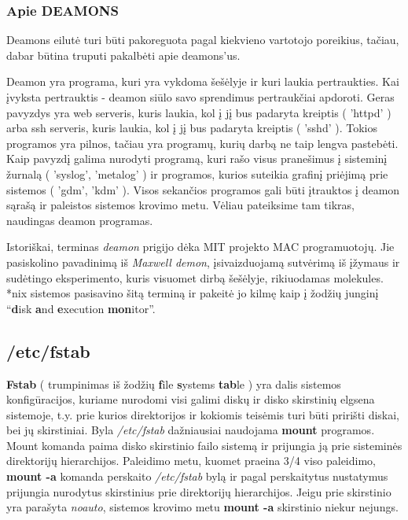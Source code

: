 \subsubsection{Apie DEAMONS}

Deamons eilutė turi būti pakoreguota pagal kiekvieno vartotojo
poreikius, tačiau, dabar būtina truputi pakalbėti apie deamons'us. 

Deamon yra programa, kuri yra vykdoma šešėlyje ir kuri laukia
pertraukties. Kai įvyksta pertrauktis - deamon siūlo savo sprendimus
pertraukčiai apdoroti. Geras pavyzdys yra web serveris, kuris laukia,
kol į jį bus padaryta kreiptis ( 'httpd' ) arba ssh serveris, kuris
laukia, kol į jį bus padaryta kreiptis ( 'sshd' ). Tokios programos
yra pilnos, tačiau yra programų, kurių darbą ne taip lengva
pastebėti. Kaip pavyzdį galima nurodyti programą, kuri rašo visus
pranešimus į sisteminį žurnalą ( 'syslog', 'metalog' ) ir programos,
kurios suteikia grafinį priėjimą prie sistemos ( 'gdm', 'kdm' ). Visos
sekančios programos gali būti įtrauktos į deamon sąrašą ir paleistos
sistemos krovimo metu. Vėliau pateiksime tam tikras, naudingas deamon
programas. 

Istoriškai, terminas \textsl{deamon} prigijo dėka MIT projekto MAC
programuotojų. Jie pasiskolino pavadinimą iš \textsl{Maxwell demon},
įsivaizduojamą sutvėrimą iš įžymaus ir sudėtingo eksperimento, kuris
visuomet dirbą šešėlyje, rikiuodamas molekules. *nix sistemos
pasisavino šitą terminą ir pakeitė jo kilmę kaip į žodžių junginį
``\textbf{d}isk \textbf{a}nd \textbf{e}xecution \textbf{mon}itor''.


\subsection{/etc/fstab}

\textbf{Fstab} ( trumpinimas iš žodžių \textbf{f}ile \textbf{s}ystems
\textbf{tab}le ) yra dalis sistemos konfigūracijos, kuriame nurodomi
visi galimi diskų ir disko skirstinių elgsena sistemoje, t.y. prie
kurios direktorijos ir kokiomis teisėmis turi būti pririšti diskai,
bei jų skirstiniai. Byla \textsl{/etc/fstab} dažniausiai naudojama
\textbf{mount} programos. Mount komanda paima disko skirstinio failo
sistemą ir prijungia ją prie sisteminės direktorijų
hierarchijos. Paleidimo metu, kuomet praeina 3/4 viso paleidimo,
\textbf{mount -a} komanda perskaito \textsl{/etc/fstab} bylą ir pagal
perskaitytus nustatymus prijungia nurodytus skirstinius prie
direktorijų hierarchijos. Jeigu prie skirstinio yra parašyta
\textsl{noauto}, sistemos krovimo metu \textbf{mount -a} skirstinio
niekur nejungs.


